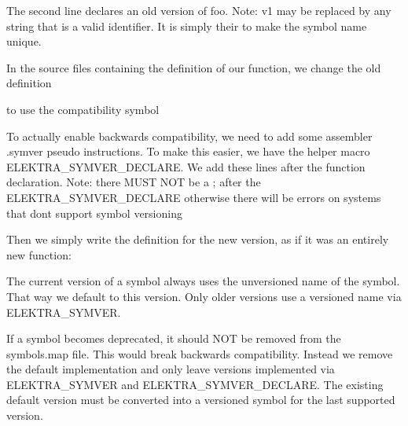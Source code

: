 The second line declares an old version of {\ttfamily foo}. Note\+: {\ttfamily v1} may be replaced by any string that is a valid identifier. It is simply their to make the symbol name unique.

In the source files containing the definition of our function, we change the old definition


\begin{DoxyCode}{0}
\DoxyCodeLine{\{}
\DoxyCodeLine{    \textcolor{comment}{// old code ...}}
\DoxyCodeLine{\}}
\end{DoxyCode}


to use the compatibility symbol


\begin{DoxyCode}{0}
\DoxyCodeLine{\{}
\DoxyCodeLine{    \textcolor{comment}{// old code ...}}
\DoxyCodeLine{\}}
\DoxyCodeLine{}
\end{DoxyCode}


To actually enable backwards compatibility, we need to add some assembler {\ttfamily .symver} pseudo instructions. To make this easier, we have the helper macro {\ttfamily E\+L\+E\+K\+T\+R\+A\+\_\+\+S\+Y\+M\+V\+E\+R\+\_\+\+D\+E\+C\+L\+A\+RE}. We add these lines after the function declaration. Note\+: there M\+U\+ST N\+OT be a {\ttfamily ;} after the {\ttfamily E\+L\+E\+K\+T\+R\+A\+\_\+\+S\+Y\+M\+V\+E\+R\+\_\+\+D\+E\+C\+L\+A\+RE} otherwise there will be errors on systems that don\textquotesingle{}t support symbol versioning

Then we simply write the definition for the new version, as if it was an entirely new function\+:


\begin{DoxyCode}{0}
\DoxyCodeLine{\{}
\DoxyCodeLine{    \textcolor{comment}{// new code ...}}
\DoxyCodeLine{\}}
\end{DoxyCode}


The current version of a symbol always uses the unversioned name of the symbol. That way we default to this version. Only older versions use a versioned name via {\ttfamily E\+L\+E\+K\+T\+R\+A\+\_\+\+S\+Y\+M\+V\+ER}.

If a symbol becomes deprecated, it should N\+OT be removed from the {\ttfamily symbols.\+map} file. This would break backwards compatibility. Instead we remove the default implementation and only leave versions implemented via {\ttfamily E\+L\+E\+K\+T\+R\+A\+\_\+\+S\+Y\+M\+V\+ER} and {\ttfamily E\+L\+E\+K\+T\+R\+A\+\_\+\+S\+Y\+M\+V\+E\+R\+\_\+\+D\+E\+C\+L\+A\+RE}. The existing default version must be converted into a versioned symbol for the last supported version. 